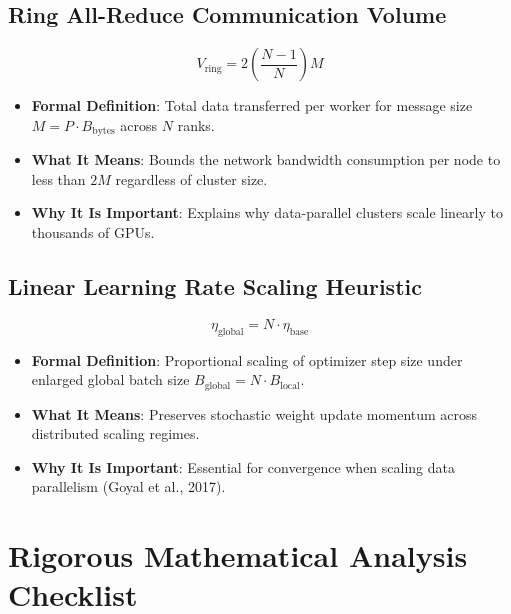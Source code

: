 \documentclass[11pt,a4paper]{article}
\theoremstyle{definition}
\begin{document}
\subsection{Ring All-Reduce Communication Volume}
{\boldmath
\begin{equation}
V_{\text{ring}} = 2 \left( \frac{N - 1}{N} \right) M
\end{equation}
}
\begin{itemize}
    \item \textbf{Formal Definition}: Total data transferred per worker for message size $M = P \cdot B_{\text{bytes}}$ across $N$ ranks.
    \item \textbf{What It Means}: Bounds the network bandwidth consumption per node to less than $2M$ regardless of cluster size.
    \item \textbf{Why It Is Important}: Explains why data-parallel clusters scale linearly to thousands of GPUs.
\end{itemize}

\subsection{Linear Learning Rate Scaling Heuristic}
{\boldmath
\begin{equation}
\eta_{\text{global}} = N \cdot \eta_{\text{base}}
\end{equation}
}
\begin{itemize}
    \item \textbf{Formal Definition}: Proportional scaling of optimizer step size under enlarged global batch size $B_{\text{global}} = N \cdot B_{\text{local}}$.
    \item \textbf{What It Means}: Preserves stochastic weight update momentum across distributed scaling regimes.
    \item \textbf{Why It Is Important}: Essential for convergence when scaling data parallelism (Goyal et al., 2017).
\end{itemize}

\section{Rigorous Mathematical Analysis Checklist}
\end{document}
